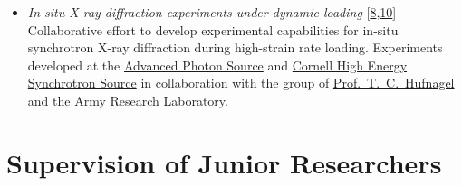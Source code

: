 \documentclass[a4paper,10pt, oneside]{article}
\begin{document}
\begin{itemize}[wide, labelwidth=!, labelindent=-1em]
\begin{itemize}[wide, labelwidth=!, labelindent=0em]
			\item \textit{In-situ X-ray diffraction experiments under dynamic loading} [\hyperref[jdbm2018]{8},\hyperref[rsi2014]{10}] \\
			Collaborative effort to develop experimental capabilities for in-situ synchrotron X-ray diffraction during high-strain rate loading. Experiments developed at the \href{https://www.aps.anl.gov/}{Advanced Photon Source} and \href{https://www.chess.cornell.edu/}{Cornell High Energy Synchrotron Source} in collaboration with the group of \href{https://engineering.jhu.edu/materials/faculty/todd-hufnagel/}{Prof.~T.~C.~Hufnagel} and the \href{https://www.arl.army.mil/}{Army Research Laboratory}.
		\end{itemize}
	\end{itemize}
	
	\section*{{Supervision of Junior Researchers}}
\end{document}
